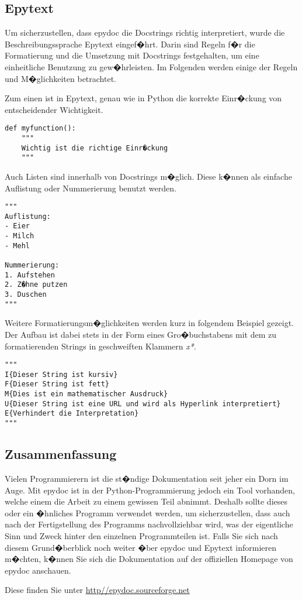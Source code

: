 \subsection*{Epytext}
\label{documentation:sec:Epytext}
Um sicherzustellen, dass epydoc die Docstrings richtig interpretiert, wurde die Beschreibungssprache Epytext eingef�hrt. 
Darin sind Regeln f�r die Formatierung und die Umsetzung mit Docstrings festgehalten, um eine einheitliche Benutzung zu gew�hrleisten. 
Im Folgenden werden einige der Regeln und M�glichkeiten betrachtet.

Zum einen ist in Epytext, genau wie in Python die korrekte Einr�ckung von entscheidender Wichtigkeit.

\begin{lstlisting}[label=documentation:lst:einrueckung]
def myfunction(): 
	"""
	Wichtig ist die richtige Einr�ckung
	"""
\end{lstlisting}

Auch Listen sind innerhalb von Docstrings m�glich. 
Diese k�nnen als einfache Auflistung oder  Nummerierung benutzt werden.
\begin{lstlisting}[label=documentation:lst:liste]
"""
Auflistung:
- Eier
- Milch
- Mehl

Nummerierung:
1. Aufstehen
2. Z�hne putzen
3. Duschen
"""
\end{lstlisting}

Weitere Formatierungsm�glichkeiten werden kurz in folgendem Beispiel gezeigt. 
Der Aufbau ist dabei stets in der Form eines Gro�buchstabens mit dem zu formatierenden Strings in geschweiften Klammern \textit{x{*}}.

\begin{lstlisting}[label=documentation:lst:liste]
"""
I{Dieser String ist kursiv}
F{Dieser String ist fett}
M{Dies ist ein mathematischer Ausdruck}
U{Dieser String ist eine URL und wird als Hyperlink interpretiert}
E{Verhindert die Interpretation}
"""
\end{lstlisting}

\subsection*{Zusammenfassung}
\label{documentation:sec:zusammenfassung}
Vielen Programmierern ist die st�ndige Dokumentation seit jeher ein Dorn im Auge. 
Mit epydoc ist in der Python-Programmierung jedoch ein Tool vorhanden, welche einem die Arbeit zu einem gewissen Teil abnimmt. 
Deshalb sollte dieses oder ein �hnliches Programm verwendet werden, um sicherzustellen, dass auch nach der Fertigstellung des Programms nachvollziehbar wird, was der eigentliche Sinn und Zweck hinter den einzelnen Programmteilen ist. 
Falls Sie sich nach diesem Grund�berblick noch weiter �ber epydoc und Epytext informieren m�chten, k�nnen Sie sich die Dokumentation auf der offiziellen Homepage von epydoc anschauen.

Diese finden Sie unter \url{http//epydoc.sourceforge.net}